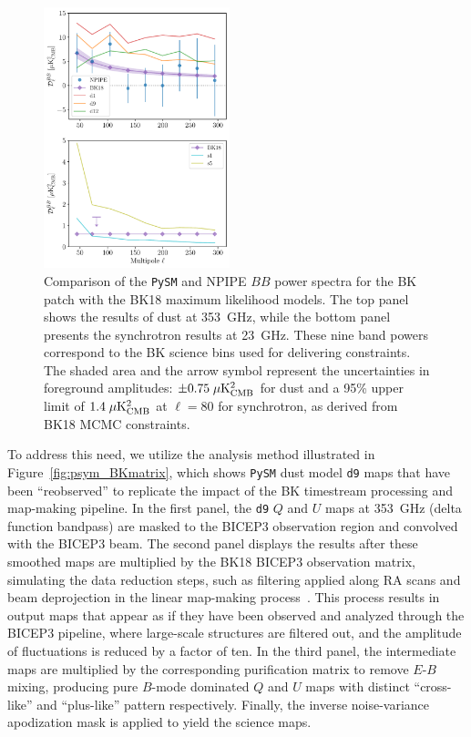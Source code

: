 \documentclass[twocolumn]{aastex631}
\begin{document}
\begin{figure}
    \centering
    \includegraphics[width=0.48\textwidth]{figures/BKfield_power.pdf}
    \caption{Comparison of the \texttt{PySM} and NPIPE $BB$ power spectra for the BK patch with the BK18 maximum likelihood models. The top panel shows the results of dust at 353~GHz, while the bottom panel presents the synchrotron results at 23~GHz. These nine band powers correspond to the BK science bins used for delivering constraints. The shaded area and the arrow symbol represent the uncertainties in foreground amplitudes: $\pm 0.75 \; \mu\rm{K^2_{CMB}}$ for dust and a 95\% upper limit of $1.4 \; \mu\rm{K^2_{CMB}}$ at $\ell = 80$ for synchrotron, as derived from BK18 MCMC constraints.}
    \label{fig:BKfield_power}
\end{figure}

To address this need, we utilize the analysis method illustrated in Figure~\ref{fig:psym_BKmatrix}, which shows \texttt{PySM} dust model \texttt{d9} maps that have been ``reobserved'' to replicate the impact of the BK timestream processing and map-making pipeline. In the first panel, the \texttt{d9} $Q$ and $U$ maps at 353~GHz (delta function bandpass) are masked to the BICEP3 observation region and convolved with the BICEP3 beam. The second panel displays the results after these smoothed maps are multiplied by the BK18 BICEP3 observation matrix, simulating the data reduction steps, such as filtering applied along RA scans and beam deprojection in the linear map-making process~\cite{BICEP2Collaboration:2016}. This process results in output maps that appear as if they have been observed and analyzed through the BICEP3 pipeline, where large-scale structures are filtered out, and the amplitude of fluctuations is reduced by a factor of ten. In the third panel, the intermediate maps are multiplied by the corresponding purification matrix to remove $E$-$B$ mixing, producing pure $B$-mode dominated $Q$ and $U$ maps with distinct ``cross-like'' and ``plus-like'' pattern respectively. Finally, the inverse noise-variance apodization mask is applied to yield the science maps. 
\end{document}
